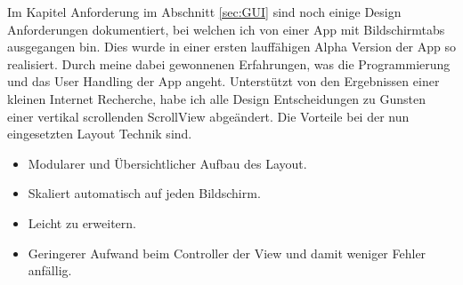 





Im Kapitel Anforderung im Abschnitt \ref{sec:GUI} sind noch einige Design Anforderungen dokumentiert, bei welchen ich von einer App mit Bildschirmtabs ausgegangen bin. Dies wurde in einer ersten lauffähigen Alpha Version der App so realisiert. Durch meine dabei gewonnenen Erfahrungen, was die Programmierung und das User Handling der App angeht. Unterstützt von den Ergebnissen einer kleinen Internet Recherche, habe ich alle Design Entscheidungen zu Gunsten einer vertikal scrollenden ScrollView abgeändert. Die Vorteile bei der nun eingesetzten Layout Technik sind.

\begin{itemize}
	\item Modularer und Übersichtlicher Aufbau des Layout.
	\item Skaliert automatisch auf jeden Bildschirm.
	\item Leicht zu erweitern.
	\item Geringerer Aufwand beim Controller der View und damit weniger Fehler anfällig.
\end{itemize} 